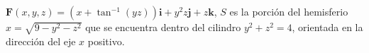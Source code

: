 \item $\mathbf{F}(x, y, z) = (x + \tan^{-1}(yz)) \mathbf{i} + y^2z \mathbf{j} + z \mathbf{k}$, $S$ es la porción del hemisferio $x = \sqrt{9 - y^2 - z^2}$ que se encuentra dentro del cilindro $y^2 + z^2 = 4$, orientada en la dirección del eje $x$ positivo.
